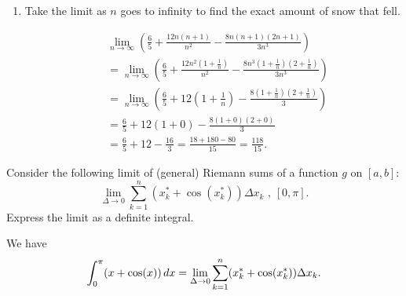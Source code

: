 \documentclass[handout, nooutcomes]{ximera}
\begin{document}
\begin{problem}
\begin{enumerate}
		
		
	\item  Take the limit as $n$ goes to infinity to find the exact amount of snow that fell.
		\begin{freeResponse}
			\begin{align*}
			&  \lim_{n \to \infty} \left( \frac{6}{5} + \frac{12n(n+1)}{n^2} - \frac{8n(n+1)(2n+1)}{3n^3} \right)  \\
			&= \lim_{n \to \infty} \left( \frac{6}{5} + \frac{12n^2(1+\frac{1}{n})}{n^2} - \frac{8n^3(1+\frac{1}{n})(2+\frac{1}{n})}{3n^3} \right)  \\
			&= \lim_{n \to \infty} \left( \frac{6}{5} + 12 \left( 1 + \frac{1}{n} \right) - \frac{8(1 + \frac{1}{n})(2 + \frac{1}{n})}{3} \right)  \\
			&= \frac{6}{5} + 12(1 + 0) - \frac{8(1+0)(2+0)}{3}  \\
			&= \frac{6}{5} + 12 - \frac{16}{3} = \frac{18 + 180 - 80}{15} = \frac{118}{15}.
			\end{align*}
		\end{freeResponse}
		
		
		
	\end{enumerate}
	
\end{problem}

\begin{problem}
  Consider the following limit of (general) Riemann sums of a function $g$ on $[a, b]$:
  \[
    \lim_{\Delta \to 0} \sum_{k = 1}^n (x_k^* + \cos(x_k^*)) \Delta x_k\mbox{ , $[0, \pi]$.}
  \]
  Express the limit as a definite integral.
  \begin{freeResponse}
    We have 
    \[
      \int_0^\pi(x + \cos(x))\d x = \lim_{\Delta \to 0} \sum_{k = 1}^n (x_k^* + \cos(x_k^*)) \Delta x_k.
    \]
  \end{freeResponse}
\end{problem}
\end{document}
